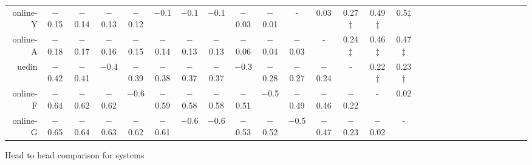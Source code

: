 \begin{tabular}{rccccccccccccccccccccccccccc}
online-Y & $-$0.15 & $-$0.14 & $-$0.13 & $-$0.12 & $-$0.1 & $-$0.1 & $-$0.1 & $-$0.03 & $-$0.01 & - &    0.03 &    0.27$\ddagger$ &    0.49$\ddagger$ &    0.5$\ddagger$ \\ 
online-A & $-$0.18 & $-$0.17 & $-$0.16 & $-$0.15 & $-$0.14 & $-$0.13 & $-$0.13 & $-$0.06 & $-$0.04 & $-$0.03 & - &    0.24$\ddagger$ &    0.46$\ddagger$ &    0.47$\ddagger$ \\ 
uedin & $-$0.42 & $-$0.41 & $-$0.4 & $-$0.39 & $-$0.38 & $-$0.37 & $-$0.37 & $-$0.3 & $-$0.28 & $-$0.27 & $-$0.24 & - &    0.22$\ddagger$ &    0.23$\ddagger$ \\ 
online-F & $-$0.64 & $-$0.62 & $-$0.62 & $-$0.6 & $-$0.59 & $-$0.58 & $-$0.58 & $-$0.51 & $-$0.5 & $-$0.49 & $-$0.46 & $-$0.22 & - &    0.02 \\ 
online-G & $-$0.65 & $-$0.64 & $-$0.63 & $-$0.62 & $-$0.61 & $-$0.6 & $-$0.6 & $-$0.53 & $-$0.52 & $-$0.5 & $-$0.47 & $-$0.23 & $-$0.02 & - \\ 


\end{tabular}
\caption{Head to head comparison for \enZH systems}
\label{pairwise-enzh}


